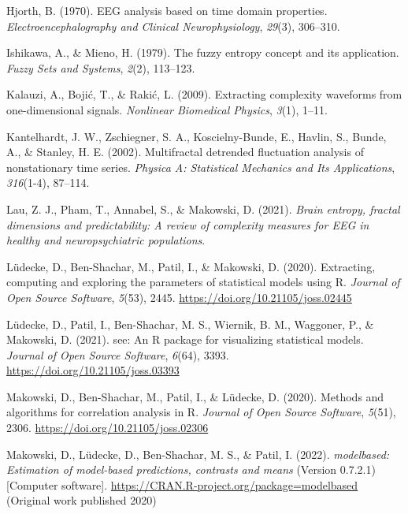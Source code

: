 \documentclass[
  man]{apa6}
\newlength{\cslhangindent}
\newlength{\cslentryspacingunit} %
\newenvironment{CSLReferences}[2] %
 {%
  \setlength{\parindent}{0pt}
  \ifodd #1
  \let\oldpar\par
  \def\par{\hangindent=\cslhangindent\oldpar}
  \fi
  \setlength{\parskip}{#2\cslentryspacingunit}
 }%
 {}
\begin{document}
\begin{CSLReferences}{1}{0}
\leavevmode{}%
Hjorth, B. (1970). EEG analysis based on time domain properties. \emph{Electroencephalography and Clinical Neurophysiology}, \emph{29}(3), 306--310.

\leavevmode{}%
Ishikawa, A., \& Mieno, H. (1979). The fuzzy entropy concept and its application. \emph{Fuzzy Sets and Systems}, \emph{2}(2), 113--123.

\leavevmode{}%
Kalauzi, A., Bojić, T., \& Rakić, L. (2009). Extracting complexity waveforms from one-dimensional signals. \emph{Nonlinear Biomedical Physics}, \emph{3}(1), 1--11.

\leavevmode{}%
Kantelhardt, J. W., Zschiegner, S. A., Koscielny-Bunde, E., Havlin, S., Bunde, A., \& Stanley, H. E. (2002). Multifractal detrended fluctuation analysis of nonstationary time series. \emph{Physica A: Statistical Mechanics and Its Applications}, \emph{316}(1-4), 87--114.

\leavevmode{}%
Lau, Z. J., Pham, T., Annabel, S., \& Makowski, D. (2021). \emph{Brain entropy, fractal dimensions and predictability: A review of complexity measures for EEG in healthy and neuropsychiatric populations}.

\leavevmode{}%
Lüdecke, D., Ben-Shachar, M., Patil, I., \& Makowski, D. (2020). Extracting, computing and exploring the parameters of statistical models using {R}. \emph{Journal of Open Source Software}, \emph{5}(53), 2445. \url{https://doi.org/10.21105/joss.02445}

\leavevmode{}%
Lüdecke, D., Patil, I., Ben-Shachar, M. S., Wiernik, B. M., Waggoner, P., \& Makowski, D. (2021). {see}: An {R} package for visualizing statistical models. \emph{Journal of Open Source Software}, \emph{6}(64), 3393. \url{https://doi.org/10.21105/joss.03393}

\leavevmode{}%
Makowski, D., Ben-Shachar, M., Patil, I., \& Lüdecke, D. (2020). Methods and algorithms for correlation analysis in {R}. \emph{Journal of Open Source Software}, \emph{5}(51), 2306. \url{https://doi.org/10.21105/joss.02306}

\leavevmode{}%
Makowski, D., Lüdecke, D., Ben-Shachar, M. S., \& Patil, I. (2022). \emph{{modelbased}: Estimation of model-based predictions, contrasts and means} (Version 0.7.2.1) {[}Computer software{]}. \url{https://CRAN.R-project.org/package=modelbased} (Original work published 2020)


\end{CSLReferences}
\end{document}
